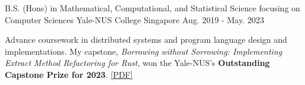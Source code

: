 

\begin{cventries}

  \cventry
    {B.S. (Hons) in Mathematical, Computational, and Statistical Science focusing on Computer Sciences} %
    {Yale-NUS College} %
    {Singapore} %
    {Aug. 2019 - May. 2023} %
    {
      \begin{cvitems} %
        \item {Advance coursework in distributed systems and program language design and implementations.  My capstone, \textit{Borrowing without Sorrowing: Implementing Extract Method Refactoring for Rust}, won the Yale-NUS's \textbf{Outstanding Capstone Prize for 2023}. \href{https://fastmail-resource.sewenthy.dev/public/academics/bsc_capstone_borrowing_without_sorrowing.pdf}{[PDF]}}
      \end{cvitems}
    }

\end{cventries}
